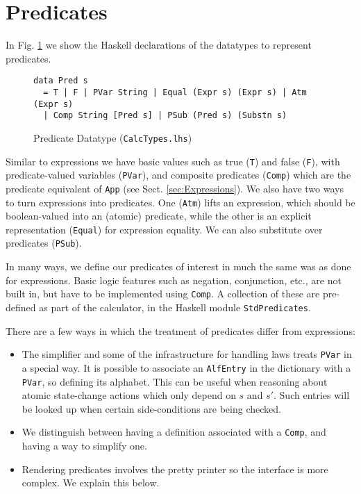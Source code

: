 \section{Predicates}\label{sec:Predicates}

In Fig. \ref{fig:pred-types} we show the Haskell declarations
of the datatypes to represent predicates.
\begin{figure}[tb]
\begin{verbatim}
data Pred s
  = T | F | PVar String | Equal (Expr s) (Expr s) | Atm (Expr s)
  | Comp String [Pred s] | PSub (Pred s) (Substn s)
\end{verbatim}
  \caption{Predicate Datatype (\texttt{CalcTypes.lhs})}
  \label{fig:pred-types}
\end{figure}

Similar to expressions we have basic values such as true (\texttt{T})
and false (\texttt{F}),
 with predicate-valued variables (\texttt{PVar}),
and composite predicates (\texttt{Comp}) which are the predicate equivalent
of \texttt{App} (see Sect. \ref{sec:Expressions}).
We also have two ways to turn expressions into predicates.
One (\texttt{Atm}) lifts an expression, which should be boolean-valued
into an (atomic) predicate,
while the other is an explicit representation (\texttt{Equal})
for expression equality.
We can also substitute over predicates (\texttt{PSub}).

In many ways,
we define our predicates of interest
in much the same was as done for expressions.
Basic logic features such as negation, conjunction, etc.,
are not built in,
but have to be implemented using \texttt{Comp}.
A collection of these are pre-defined as part of the calculator,
in the Haskell module \texttt{StdPredicates}.

There are a few ways in which the treatment of predicates
differ from expressions:
\begin{itemize}
  \item
    The simplifier and some of the infrastructure for handling
    laws treats \texttt{PVar} in a special way.
    It is possible to associate an \texttt{AlfEntry} in the dictionary
    with a \texttt{PVar}, so defining its alphabet.
    This can be useful when reasoning about atomic state-change
    actions which only depend on $s$ and $s'$.
    Such entries will be looked up when certain
    side-conditions are being checked.
  \item
    We distinguish between having a definition associated with a \texttt{Comp},
    and having a way to simplify one.
  \item
    Rendering predicates involves the pretty printer
    so the interface is more complex.
    We explain this below.
\end{itemize}



